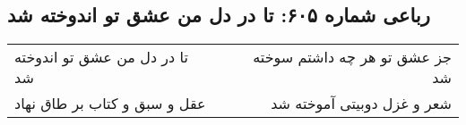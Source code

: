 \begin{center}
\section*{رباعی شماره ۶۰۵: تا در دل من عشق تو اندوخته شد}
\label{sec:0605}
\begin{longtable}{l p{0.5cm} r}
تا در دل من عشق تو اندوخته شد
&&
جز عشق تو هر چه داشتم سوخته شد
\\
عقل و سبق و کتاب بر طاق نهاد
&&
شعر و غزل دوبیتی آموخته شد
\\
\end{longtable}
\end{center}
